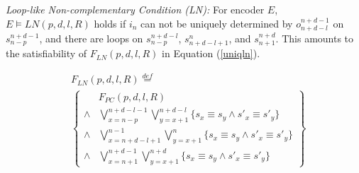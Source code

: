 \documentclass[journal]{IEEEtran}
\begin{document}
%


\begin{definition11}\label{def_lnc}%
\emph{Loop-like Non-complementary Condition (LN):} For encoder $E$,
$E\vDash LN(p,d,l,R)$ holds if
$i_n$ can not be uniquely determined by $o_{n+d-l}^{n+d-1}$ on $s_{n-p}^{n+d-1}$,
and there are loops on $s_{n-p}^{n+d-l}$, $s_{n+d-l+1}^n$, and $s_{n+1}^{n+d}$.
This amounts to the satisfiability of $F_{LN}(p,d,l,R)$ in Equation (\ref{uniqln}).
\end{definition11}


\begin{equation}\label{uniqln}
\begin{split}
&F_{LN}(p,d,l,R)\stackrel{def}{=}\\
&\left\{
\begin{array}{cc}
&F_{PC}(p,d,l,R) \\
\wedge& \bigvee_{x=n-p}^{n+d-l-1}\bigvee_{y=x+1}^{n+d-l} \{s_x\equiv s_y\wedge s'_x\equiv s'_y\} \\
\wedge& \bigvee_{x=n+d-l+1}^{n-1}\bigvee_{y=x+1}^{n} \{s_x\equiv s_y\wedge s'_x\equiv s'_y\} \\
\wedge& \bigvee_{x=n+1}^{n+d-1}\bigvee_{y=x+1}^{n+d} \{s_x\equiv s_y\wedge s'_x\equiv s'_y\}
\end{array}
\right\}
\end{split}
\end{equation}

\end{document}

